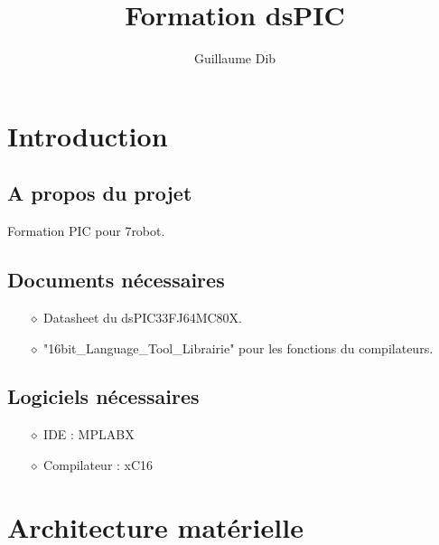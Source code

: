 \documentclass[a4paper]{article}
\author{Guillaume Dib}
\title{Formation dsPIC}
\begin{document}
\maketitle
\clearpage

\tableofcontents
\clearpage

\section{Introduction} 
	\subsection{A propos du projet}

Formation PIC pour 7robot.

	\subsection{Documents nécessaires}

 \begin{itemize}
 	\item[$\diamond$] Datasheet du dsPIC33FJ64MC80X.
 	\item[$\diamond$] "16bit\_Language\_Tool\_Librairie" pour les fonctions du compilateurs.
\end{itemize}

	\subsection{Logiciels nécessaires}
	
\begin{itemize}
 	\item[$\diamond$] IDE : MPLABX
 	\item[$\diamond$] Compilateur : xC16
\end{itemize}

\section{Architecture matérielle}
\end{document}
